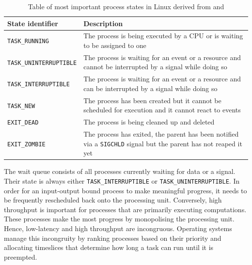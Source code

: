 \begin{table}[h!]
    \centering
    \begin{tabular}{ |m{4cm}|m{20em}| }
        \hline
        State identifier & Description \\
        \hline
        \verb|TASK_RUNNING| & The process is being executed by a CPU or is waiting to be assigned to one \\
        \hline 
        \verb|TASK_UNINTERRUPTIBLE| & The process is waiting for an event or a resource and cannot be interrupted by a signal while doing so \\
        \hline
        \verb|TASK_INTERRUPTIBLE| & The process is waiting for an event or a resource and can be interrupted by a signal while doing so \\
        \hline
        \verb|TASK_NEW| & The process has been created but it cannot be scheduled for execution and it cannot react to events \\
        \hline
        \verb|EXIT_DEAD| & The process is being cleaned up and deleted \\
        \hline
        \verb|EXIT_ZOMBIE| & The process has exited, the parent has been notified via a \verb|SIGCHLD| signal but the parent has not reaped it yet \\
        \hline
    \end{tabular}
    \caption{Table of most important process states in Linux derived from \cite{include/linux/sched.h} and \cite{kernel/sched/core.c}}
    \label{table:proc-states}
\end{table}
The wait queue consists of all processes currently waiting for data or a signal.
Their state is always either \verb|TASK_INTERRUPTIBLE| or \verb|TASK_UNINTERRUPTIBLE|.
In order for an input-output bound process to make meaningful progress, it needs to be frequently 
rescheduled back onto the processing unit. 
Conversely, high throughput is important for processes that are primarily executing computations.
These processes make the most progress by monopolising the processing unit. Hence, 
low-latency and high throughput are incongruous. Operating systems manage 
this incongruity by ranking processes based on their priority and allocating timeslices that 
determine how long a task can run until it is preempted.

